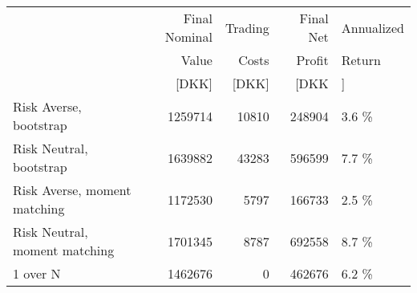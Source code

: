 \begin{tabular}{lrrrl}
\toprule
{} & Final Nominal &  Trading &  Final Net & Annualized \\
{} & Value & Costs & Profit & Return \\
{} & [DKK] & [DKK] & [DKK &]\\
\midrule
Risk Averse, bootstrap        &              1259714 &          10810 &            248904 &             3.6 \% \\
Risk Neutral, bootstrap       &              1639882 &          43283 &            596599 &             7.7 \% \\
Risk Averse, moment matching  &              1172530 &           5797 &            166733 &             2.5 \% \\
Risk Neutral, moment matching &              1701345 &           8787 &            692558 &             8.7 \% \\
1 over N                      &              1462676 &              0 &            462676 &             6.2 \% \\
\bottomrule
\end{tabular}
